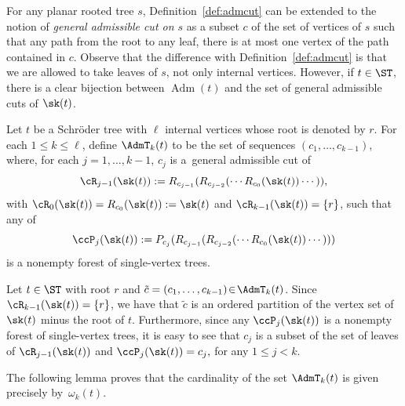 \begin{Remark}\label{rem:generalcuts}For any planar rooted tree $s$, Definition~\ref{def:admcut} can be extended to the notion of \textit{general admissible cut on $s$} as a subset $c$ of the set of vertices of $s$ such that any path from the root to any leaf, there is at most one vertex of the path contained in $c$. Observe that the difference with Definition~\ref{def:admcut} is that we are allowed to take leaves of $s$, not only internal vertices. However, if $t\in \ST$, there is a clear bijection between $\operatorname{Adm}(t)$ and the set of general admissible cuts of $\sk(t)$.
\end{Remark}

Let $t$ be a Schr\"oder tree with $\ell$ internal vertices whose root is denoted by $r$. For each $1\leq k\leq \ell$, define $\AdmT_k(t)$ to be the set of sequences $(c_1,\dots,c_{k-1})$, where, for each $j=1,\dots,k-1$, $c_j$ is a~general admissible cut of
\[
	\cR_{j-1}(\sk(t)) := R_{c_{j-1}}(R_{c_{j-2}}(\cdots R_{c_0}(\sk(t))\cdots)),
\]
with $\cR_0(\sk(t))=R_{c_0}(\sk(t)) := \sk(t)$ and $\cR_{k-1}(\sk(t)) =\{r\}$, such that any of
\[
	\ccP_{j}(\sk(t)):=P_{c_j}(R_{c_{j-1}}(R_{c_{j-2}}(\cdots R_{c_0}(\sk(t))\cdots)))
\]
is a nonempty forest of single-vertex trees.

\begin{Remark}Let $t\in \ST$ with root $r$ and $\tilde{c}= (c_1,\dots,c_{k-1})\!\in\! \AdmT_k(t)$. Since \mbox{$\cR_{k-1}(\sk(t)) = \{r\}$}, we have that $\tilde{c}$ is an ordered partition of the vertex set of $\sk(t)$ minus the root of $t$. Furthermore, since any $\ccP_j(\sk(t))$ is a nonempty forest of single-vertex trees, it is easy to see that $c_j$ is a subset of the set of leaves of $\cR_{j-1}(\sk(t))$ and $ \ccP_j(\sk(t)) = c_j,$ for any $1\leq j <k$.
\end{Remark}

The following lemma proves that the cardinality of the set $\AdmT_k(t)$ is given precisely by~$\omega_k(t)$.

